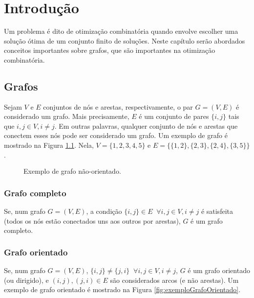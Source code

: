 \chapter{Introdução}
Um problema é dito de otimização combinatória quando envolve escolher uma solução ótima de um conjunto finito de soluções. Neste capítulo serão abordados conceitos importantes sobre grafos, que são importantes na otimização combinatória.

\section{Grafos}
Sejam $V$ e $E$ conjuntos de nós e arestas, respectivamente, o par \(G = (V, E)\) é considerado um grafo. Mais precisamente, \(E\) é um conjunto de pares \(\{i, j\}\) tais que \(i, j \in V, i \neq j\). Em outras palavras, qualquer conjunto de nós e arestas que conectem esses nós pode ser considerado um grafo. Um exemplo de grafo é mostrado na Figura \ref{fig:exemploGrafo}. Nela, \(V = \{1,2,3,4,5\}\) e \(E = \{\{1,2\}, \{2,3\}, \{2,4\}, \{3,5\}\}\).

\begin{figure}[!htbp]
    \centering

    \caption{Exemplo de grafo não-orientado.}
    \label{fig:exemploGrafo}
\end{figure}

\subsection{Grafo completo}
Se, num grafo \(G = (V, E)\), a condição \(\{i, j\} \in E \;\; \forall i,j \in V, i \neq j\) é satisfeita (todos os nós estão conectados uns aos outros por arestas), \(G\) é um grafo completo.

\subsection{Grafo orientado}
Se, num grafo \(G = (V, E)\), \(\{i, j\} \neq \{j, i\} \;\; \forall i, j \in V, i \neq j\), \(G\) é um grafo orientado (ou dirigido), e \((i, j), (j, i) \in E\) são considerados arcos (e não arestas). Um exemplo de grafo orientado é mostrado na Figura \ref{fig:exemploGrafoOrientado}.

